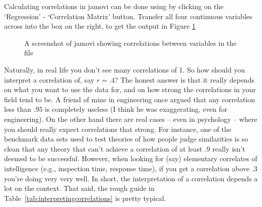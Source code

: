 
Calculating correlations in jamovi can be done using by clicking on the `Regression' - `Correlation Matrix' button. Transfer all four continuous variables across into the box on the right, to get the output in Figure \ref{fig:correlations}

\vspace{1cm}
\begin{figure}[ht]
\begin{center}
\caption{A screenshot of jamovi showing correlations between variables in the  file}
\label{fig:correlations}
\HR
\end{center}
\end{figure}


 
Naturally, in real life you don't see many correlations of 1. So how should you interpret a correlation of, say $r= .4$? The honest answer is that it really depends on what you want to use the data for, and on how strong the correlations in your field tend to be. A  friend of mine in engineering once argued that any correlation less than $.95$ is completely useless (I think he was exaggerating, even for engineering). On the other hand there are real cases -- even in psychology -- where you should really expect correlations that strong. For instance, one of the benchmark data sets used to test theories of how people judge similarities is so clean that any theory that can't achieve a correlation of at least $.9$ really isn't deemed to be successful. However, when looking for (say) elementary correlates of intelligence (e.g., inspection time, response time), if you get a correlation above $.3$ you're doing very very well. In short, the interpretation of a correlation depends a lot on the context. That said, the rough guide in Table~\ref{tab:interpretingcorrelations} is pretty typical.

